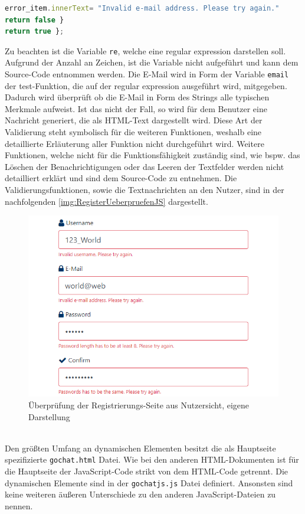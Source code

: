 \documentclass[a4paper,titlepage,halfparskip,12pt]{scrreprt}
\begin{document}
\begin{onehalfspacing}
\begin{lstlisting}[language=Javascript,caption=Validierungsfunktion \textit{validateEmail()},label={lst:RegisterValidateFunction}]
error_item.innerText= "Invalid e-mail address. Please try again."
return false }
return true };
\end{lstlisting}
Zu beachten ist die Variable \texttt{re}, welche eine regular expression darstellen soll. Aufgrund der Anzahl an Zeichen, ist die Variable nicht aufgeführt und kann dem Source-Code entnommen werden. Die E-Mail wird in Form der Variable \texttt{email} der test-Funktion, die auf der regular expression ausgeführt wird, mitgegeben. Dadurch wird überprüft ob die E-Mail in Form des Strings alle typischen Merkmale aufweist. Ist das nicht der Fall, so wird für dem Benutzer eine Nachricht generiert, die als \ac{HTML}-Text dargestellt wird. Diese Art der Validierung steht symbolisch für die weiteren Funktionen, weshalb eine detaillierte Erläuterung aller Funktion nicht durchgeführt wird. Weitere Funktionen, welche nicht für die Funktionsfähigkeit zuständig sind, wie bspw. das Löschen der Benachrichtigungen oder das Leeren der Textfelder werden nicht detailliert erklärt und sind dem Source-Code zu entnehmen. Die Validierungsfunktionen, sowie die Textnachrichten an den Nutzer, sind in der nachfolgenden \autoref{img:RegisterUeberpruefenJS} dargestellt.
\begin{figure}[h]
	\centering
	\includegraphics[scale=0.8]{images/RegisterUeberpruefenJS}
	\caption{Überprüfung der Registrierungs-Seite aus Nutzersicht, eigene Darstellung}
	\label{img:RegisterUeberpruefenJS}
\end{figure}\\
Den größten Umfang an dynamischen Elementen besitzt die als Hauptseite spezifizierte \texttt{gochat.html} Datei. Wie bei den anderen HTML-Dokumenten ist für die Hauptseite der JavaScript-Code strikt von dem HTML-Code getrennt. Die dynamischen Elemente sind in der \texttt{gochatjs.js} Datei definiert. Ansonsten sind keine weiteren äußeren Unterschiede zu den anderen JavaScript-Dateien zu nennen. 

\end{onehalfspacing}
\end{document}
